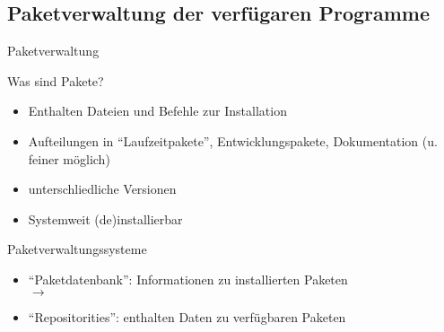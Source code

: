 \documentclass[aspectratio=43]{beamer}
\begin{document}
\subsection{Paketverwaltung der verfügaren Programme}
\begin{frame}{Paketverwaltung}
  \begin{block}{Was sind Pakete?}
    \begin{itemize}
      \item Enthalten Dateien und Befehle zur Installation 
      \item Aufteilungen in ``Laufzeitpakete'', Entwicklungspakete, Dokumentation (u. feiner möglich)
      \item unterschliedliche Versionen
      \item Systemweit (de)installierbar 
    \end{itemize}
  \end{block}
  \begin{block}{Paketverwaltungssysteme}
    \begin{itemize}
      \item ``Paketdatenbank'': Informationen zu installierten Paketen\\ $\rightarrow$ 
      \item ``Repositorities'':  enthalten Daten zu verfügbaren Paketen
    \end{itemize}
  \end{block}
\end{frame}
\end{document}

